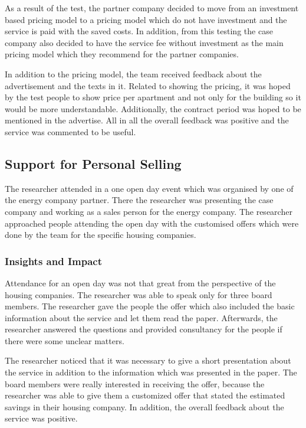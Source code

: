 As a result of the test, the partner company decided to move from an investment based pricing model to a pricing model which do not have investment and the service is paid with the saved costs. In addition, from this testing the case company also decided to have the service fee without investment as the main pricing model which they recommend for the partner companies.

In addition to the pricing model, the team received feedback about the advertisement and the texts in it. Related to showing the pricing, it was hoped by the test people to show price per apartment and not only for the building so it would be more understandable. Additionally, the contract period was hoped to be mentioned in the advertise. All in all the overall feedback was positive and the service was commented to be useful.

\subsection{Support for Personal Selling}

The researcher attended in a one open day event which was organised by one of the energy company partner. There the researcher was presenting the case company and working as a sales person for the energy company. The researcher approached people attending the open day with the customised offers which were done by the team for the specific housing companies.

\subsubsection*{Insights and Impact}

Attendance for an open day was not that great from the perspective of the housing companies. The researcher was able to speak only for three board members. The researcher gave the people the offer which also included the basic information about the service and let them read the paper. Afterwards, the researcher answered the questions and provided consultancy for the people if there were some unclear matters.

The researcher noticed that it was necessary to give a short presentation about the service in addition to the information which was presented in the paper. The board members were really interested in receiving the offer, because the researcher was able to give them a customized offer that stated the estimated savings in their housing company. In addition, the overall feedback about the service was positive.


